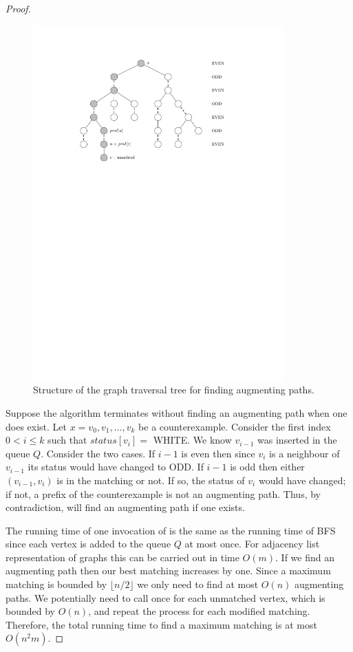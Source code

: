 \begin{proof}
\begin{figure}
\centerline{\includegraphics[width=3.8in]{figs/augtree}}

\caption{Structure of the graph traversal tree for finding augmenting paths.}
\label{fig:augtree}
\end{figure}

Suppose the algorithm  terminates without
finding an augmenting path when one does exist.  Let $x=v_0,v_1,\ldots,v_k$
be a counterexample.  Consider the
first index $0<i\leq k$ such that $status[v_i] =$ WHITE.  We know $v_{i-1}$ was
inserted in the queue $Q$. Consider the two cases.  If $i-1$ is even then
since $v_i$ is a neighbour of $v_{i-1}$ its status would have changed to
ODD.
If $i-1$ is odd then either $(v_{i-1},v_i)$ is in the matching or not.
If so, the status of $v_i$ would have changed; if not, a prefix of the 
counterexample is not an augmenting path.  Thus, by contradiction,
 will find an augmenting path if one exists.

The running time of one invocation of  is the same 
as the running time of BFS since each vertex is added to the queue $Q$
at most once.  For adjacency list representation of graphs this 
can be carried out in time $O(m)$.  If we find an augmenting path
then our best matching increases by one.  
Since a maximum matching is bounded by $\lfloor n/2 \rfloor$ we
only need to find at most $O(n)$ augmenting paths.
We potentially need to call 
once for each unmatched vertex, which is bounded by $O(n)$, and 
repeat the process for each modified matching.  Therefore, the total 
running time to find a maximum matching is at most $O(n^2m)$.
\end{proof}

